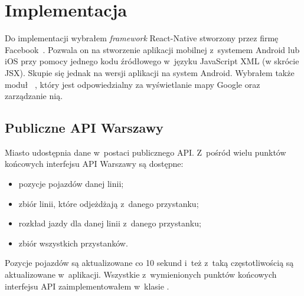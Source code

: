 \documentclass{SGGW-thesis}
\begin{document}
\chapter{Implementacja}
Do implementacji wybrałem \textit{framework} React-Native stworzony przez firmę Facebook~\cite{REACT}.
Pozwala on na stworzenie aplikacji mobilnej z~systemem Android lub iOS przy pomocy jednego kodu źródłowego w~języku JavaScript XML (w skrócie JSX).
Skupie się jednak na wersji aplikacji na system Android.
Wybrałem także moduł ~\cite{REACTMAPS}, który jest odpowiedzialny za wyświetlanie mapy Google oraz zarządzanie nią.

\section{Publiczne API Warszawy}
Miasto udostępnia dane w~postaci publicznego API.
Z~pośród wielu punktów końcowych interfejsu API Warszawy są dostępne:
\begin{itemize}
  \item{pozycje pojazdów danej linii;}
  \item{zbiór linii, które odjeżdżają z~danego przystanku;}
  \item{rozkład jazdy dla danej linii z~danego przystanku;}
  \item{zbiór wszystkich przystanków.}
\end{itemize}
Pozycje pojazdów są aktualizowane co 10 sekund i~też z~taką częstotliwością są aktualizowane w~aplikacji.
Wszystkie z~wymienionych punktów końcowych interfejsu API zaimplementowałem w~klasie .
\end{document}
